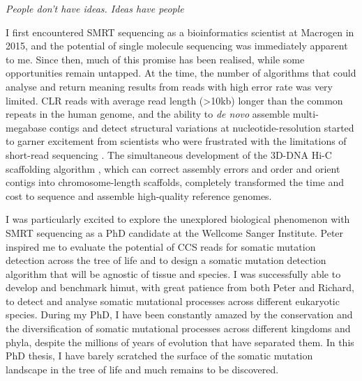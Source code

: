 \textit{People don't have ideas. Ideas have people}
\begin{flushright}  \end{flushright} 
 
I first encountered SMRT sequencing as a bioinformatics scientist at Macrogen in 2015, and the potential of single molecule sequencing was immediately apparent to me. Since then, much of this promise has been realised, while some opportunities remain untapped. At the time, the number of algorithms that could analyse and return meaning results from reads with high error rate was very limited. CLR reads with average read length (>10kb) longer than the common repeats in the human genome, and the ability to \textit{de novo} assemble multi-megabase contigs \cite {} and detect structural variations at nucleotide-resolution \cite{} started to garner excitement from scientists who were frustrated with the limitations of short-read sequencing \cite{}. The simultaneous development of the 3D-DNA Hi-C scaffolding algorithm \cite{}, which can correct assembly errors and order and orient contigs into chromosome-length scaffolds, completely transformed the time and cost to sequence and assemble high-quality reference genomes. 
 
I was particularly excited to explore the unexplored biological phenomenon with SMRT sequencing as a PhD candidate at the Wellcome Sanger Institute. Peter inspired me to evaluate the potential of CCS reads for somatic mutation detection across the tree of life and to design a somatic mutation detection algorithm that will be agnostic of tissue and species. I was successfully able to develop and benchmark himut, with great patience from both Peter and Richard, to detect and analyse somatic mutational processes across different eukaryotic species. During my PhD, I have been constantly amazed by the conservation and the diversification of somatic mutational processes across different kingdoms and phyla, despite the millions of years of evolution that have separated them. In this PhD thesis, I have barely scratched the surface of the somatic mutation landscape in the tree of life and much remains to be discovered. 
 
